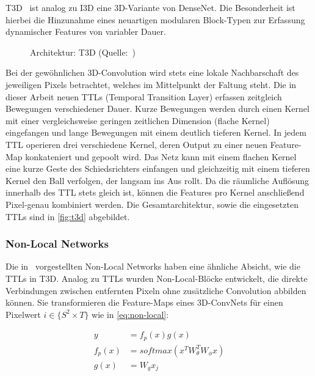 T3D~\cite{Diba17} ist analog zu I3D eine 3D-Variante von DenseNet.
Die Besonderheit ist hierbei die Hinzunahme eines neuartigen modularen Block-Typen zur Erfassung dynamischer Features von variabler Dauer.

\begin{figure}[h!]
    \centering
    \caption{Architektur: T3D (Quelle:~\cite{Diba17})}
    \label{fig:t3d}
\end{figure}

Bei der gewöhnlichen 3D-Convolution wird stets eine lokale Nachbarschaft des jeweiligen Pixels betrachtet, welches im Mittelpunkt der Faltung steht.
Die in dieser Arbeit neuen TTLs (Temporal Transition Layer) erfassen zeitgleich Bewegungen verschiedener Dauer.
Kurze Bewegungen werden durch einen Kernel mit einer vergleichsweise geringen zeitlichen Dimension (flache Kernel) eingefangen und lange Bewegungen mit einem deutlich tieferen Kernel.
In jedem TTL operieren drei verschiedene Kernel, deren Output zu einer neuen Feature-Map konkateniert und gepoolt wird.
Das Netz kann mit einem flachen Kernel \zB eine kurze Geste des Schiedsrichters einfangen und gleichzeitig mit einem tieferen Kernel den Ball verfolgen, der langsam ins Aus rollt.
Da die räumliche Auflösung innerhalb des TTL stets gleich ist, können die Features pro Kernel anschließend Pixel-genau kombiniert werden.
Die Gesamtarchitektur, sowie die eingesetzten TTLs sind in \autoref{fig:t3d} abgebildet.

\subsubsection*{Non-Local Networks}

Die in~\cite{Wang18} vorgestellten Non-Local Networks haben eine ähnliche Absicht, wie die TTLs in T3D.
Analog zu TTLs wurden Non-Local-Blöcke entwickelt, die direkte Verbindungen zwischen entfernten Pixeln ohne zusätzliche Convolution abbilden können.
Sie transformieren die Feature-Maps eines 3D-ConvNets für einen Pixelwert $i \in \{S^2 \times T\}$ wie in \autoref{eq:non-local}:

\begin{equation}
\label{eq:non-local}
\begin{split}
    y           & = f_p(x) g(x) \\
    f_p(x)      & = softmax(x^T W^T_\theta W_\phi x) \\
    g(x)        & = W_g x_j
\end{split}
\end{equation}

